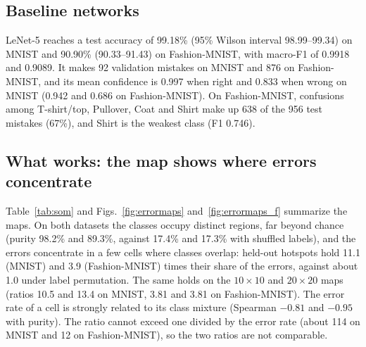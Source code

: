 \documentclass[preprint,review,12pt]{elsarticle}
\begin{document}
\subsection{Baseline networks}

LeNet-5 reaches a test accuracy of 99.18\% (95\% Wilson interval 98.99--99.34) on MNIST and 90.90\% (90.33--91.43) on Fashion-MNIST, with macro-F1 of 0.9918 and 0.9089. It makes 92 validation mistakes on MNIST and 876 on Fashion-MNIST, and its mean confidence is 0.997 when right and 0.833 when wrong on MNIST (0.942 and 0.686 on Fashion-MNIST). On Fashion-MNIST, confusions among T-shirt/top, Pullover, Coat and Shirt make up 638 of the 956 test mistakes (67\%), and Shirt is the weakest class (F1 0.746).

\subsection{What works: the map shows where errors concentrate}

Table~\ref{tab:som} and Figs.~\ref{fig:errormaps} and~\ref{fig:errormaps_f} summarize the maps. On both datasets the classes occupy distinct regions, far beyond chance (purity 98.2\% and 89.3\%, against 17.4\% and 17.3\% with shuffled labels), and the errors concentrate in a few cells where classes overlap: held-out hotspots hold 11.1 (MNIST) and 3.9 (Fashion-MNIST) times their share of the errors, against about 1.0 under label permutation. The same holds on the $10\times10$ and $20\times20$ maps (ratios 10.5 and 13.4 on MNIST, 3.81 and 3.81 on Fashion-MNIST). The error rate of a cell is strongly related to its class mixture (Spearman $-0.81$ and $-0.95$ with purity). The ratio cannot exceed one divided by the error rate (about 114 on MNIST and 12 on Fashion-MNIST), so the two ratios are not comparable.
\end{document}
